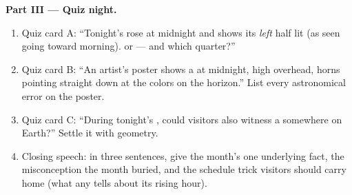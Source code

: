 \begin{problem}
\medskip\noindent\textbf{Part III --- Quiz night.}
\begin{enumerate}[resume]
  \item Quiz card A: ``Tonight's  rose at midnight and
        shows its \emph{left} half lit (as seen going toward
        morning).  or  --- and which quarter?''
  \item Quiz card B: ``An artist's poster shows a  
        at midnight, high overhead, horns pointing straight
        down at the  colors on the horizon.'' List every
        astronomical error on the poster.
  \item Quiz card C: ``During tonight's , could
        visitors also witness a  somewhere on
        Earth?'' Settle it with  geometry.
  \item Closing speech: in three sentences, give the month's
        one underlying fact, the misconception the month
        buried, and the schedule trick visitors should carry
        home (what any  tells about its rising hour).
\end{enumerate}
\end{problem}
